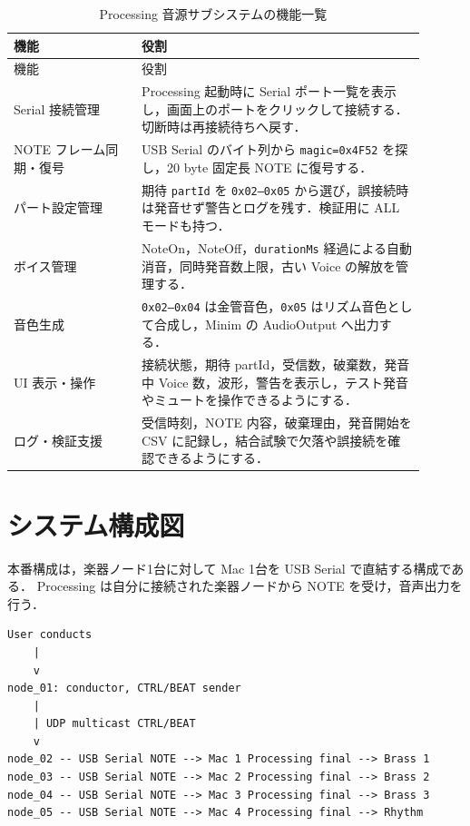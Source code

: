 \documentclass[lualatex,book,openany,paper=a4paper,jafontsize=11.5pt,jafontscale=1.05]{jlreq}
\begin{document}
\begin{longtable}{p{0.28\linewidth}p{0.62\linewidth}}
\caption{Processing 音源サブシステムの機能一覧}\label{tab:fbs}\\
\toprule
機能 & 役割 \\
\midrule
\endfirsthead
\toprule
機能 & 役割 \\
\midrule
\endhead
Serial 接続管理 &
Processing 起動時に Serial ポート一覧を表示し，画面上のポートをクリックして接続する．切断時は再接続待ちへ戻す． \\
NOTE フレーム同期・復号 &
USB Serial のバイト列から \texttt{magic=0x4F52} を探し，20 byte 固定長 NOTE に復号する． \\
パート設定管理 &
期待 \texttt{partId} を \texttt{0x02--0x05} から選び，誤接続時は発音せず警告とログを残す．検証用に ALL モードも持つ． \\
ボイス管理 &
NoteOn，NoteOff，\texttt{durationMs} 経過による自動消音，同時発音数上限，古い Voice の解放を管理する． \\
音色生成 &
\texttt{0x02--0x04} は金管音色，\texttt{0x05} はリズム音色として合成し，Minim の AudioOutput へ出力する． \\
UI 表示・操作 &
接続状態，期待 partId，受信数，破棄数，発音中 Voice 数，波形，警告を表示し，テスト発音やミュートを操作できるようにする． \\
ログ・検証支援 &
受信時刻，NOTE 内容，破棄理由，発音開始を CSV に記録し，結合試験で欠落や誤接続を確認できるようにする． \\
\bottomrule
\end{longtable}

\section{システム構成図}
本番構成は，楽器ノード1台に対して Mac 1台を USB Serial で直結する構成である．
Processing は自分に接続された楽器ノードから NOTE を受け，音声出力を行う．

\begin{lstlisting}[style=textdiagram, caption={Processing 音源サブシステムを含む全体構成}, label={lst:overview}]
User conducts
    |
    v
node_01: conductor, CTRL/BEAT sender
    |
    | UDP multicast CTRL/BEAT
    v
node_02 -- USB Serial NOTE --> Mac 1 Processing final --> Brass 1
node_03 -- USB Serial NOTE --> Mac 2 Processing final --> Brass 2
node_04 -- USB Serial NOTE --> Mac 3 Processing final --> Brass 3
node_05 -- USB Serial NOTE --> Mac 4 Processing final --> Rhythm
\end{lstlisting}
\end{document}
